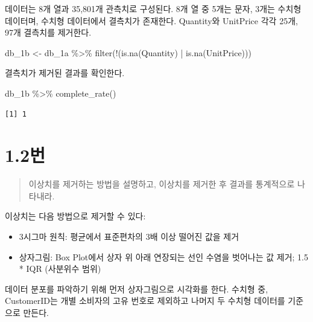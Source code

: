 \documentclass[
  letterpaper,
  DIV=11,
  numbers=noendperiod]{scrreprt}
\newenvironment{Shaded}{\begin{snugshade}}{\end{snugshade}}
\newcommand{\FunctionTok}[1]{\textcolor[rgb]{0.28,0.35,0.67}{#1}}
\newcommand{\NormalTok}[1]{\textcolor[rgb]{0.00,0.23,0.31}{#1}}
\newcommand{\OtherTok}[1]{\textcolor[rgb]{0.00,0.23,0.31}{#1}}
\newcommand{\SpecialCharTok}[1]{\textcolor[rgb]{0.37,0.37,0.37}{#1}}
\providecommand{\tightlist}{%
  \setlength{\itemsep}{0pt}\setlength{\parskip}{0pt}}\usepackage{longtable,booktabs,array}
\begin{document}
데이터는 8개 열과 35,801개 관측치로 구성된다. 8개 열 중 5개는 문자,
3개는 수치형 데이터며, 수치형 데이터에서 결측치가 존재한다. Quantity와
UnitPrice 각각 25개, 97개 결측치를 제거한다.

\begin{Shaded}
\begin{Highlighting}[]
\NormalTok{db\_1b }\OtherTok{\textless{}{-}}\NormalTok{ db\_1a }\SpecialCharTok{\%\textgreater{}\%}
  \FunctionTok{filter}\NormalTok{(}\SpecialCharTok{!}\NormalTok{(}\FunctionTok{is.na}\NormalTok{(Quantity) }\SpecialCharTok{|} \FunctionTok{is.na}\NormalTok{(UnitPrice)))}
\end{Highlighting}
\end{Shaded}

결측치가 제거된 결과를 확인한다.

\begin{Shaded}
\begin{Highlighting}[]
\NormalTok{db\_1b }\SpecialCharTok{\%\textgreater{}\%} \FunctionTok{complete\_rate}\NormalTok{()}
\end{Highlighting}
\end{Shaded}

\begin{verbatim}
[1] 1
\end{verbatim}

\hypertarget{uxbc88-19}{%
\section*{1.2번}\label{uxbc88-19}}


\begin{quote}
이상치를 제거하는 방법을 설명하고, 이상치를 제거한 후 결과를 통계적으로
나타내라.
\end{quote}

이상치는 다음 방법으로 제거할 수 있다:

\begin{itemize}
\tightlist
\item
  3시그마 원칙: 평균에서 표준편차의 3배 이상 떨어진 값을 제거
\item
  상자그림: Box Plot에서 상자 위 아래 연장되는 선인 수염을 벗어나는 값
  제거; 1.5 * IQR (사분위수 범위)
\end{itemize}

데이터 분포를 파악하기 위해 먼저 상자그림으로 시각화를 한다. 수치형 중,
CustomerID는 개별 소비자의 고유 번호로 제외하고 나머지 두 수치형
데이터를 기준으로 만든다.
\end{document}
